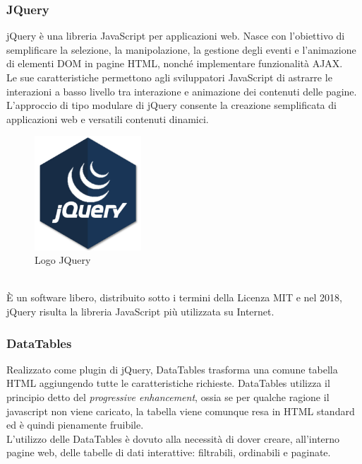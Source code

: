 \subsubsection{JQuery}
jQuery è una libreria JavaScript per applicazioni web. Nasce con l'obiettivo di semplificare la selezione, la manipolazione, la gestione degli eventi e l'animazione di elementi DOM in pagine HTML, nonché implementare funzionalità AJAX.
\\
Le sue caratteristiche permettono agli sviluppatori JavaScript di astrarre le interazioni a basso livello tra interazione e animazione dei contenuti delle pagine. L'approccio di tipo modulare di jQuery consente la creazione semplificata di applicazioni web e versatili contenuti dinamici.
\begin{figure}[!h] 
    \centering 
    \includegraphics[width=4cm]{immagini/loghi/jquery.png}
    \caption{Logo JQuery}
\end{figure}
\\
È un software libero, distribuito sotto i termini della Licenza MIT e nel 2018, jQuery risulta la libreria JavaScript più utilizzata su Internet.

\subsubsection{DataTables}
Realizzato come plugin di jQuery, DataTables trasforma una comune tabella HTML aggiungendo tutte le caratteristiche richieste. DataTables utilizza il principio detto del \textit{progressive enhancement}, ossia se per qualche ragione il javascript non viene caricato, la tabella viene comunque resa in HTML standard ed è quindi pienamente fruibile.
\\
L'utilizzo delle DataTables è dovuto alla necessità di dover creare, all'interno pagine web, delle tabelle di dati interattive: filtrabili, ordinabili e paginate.

